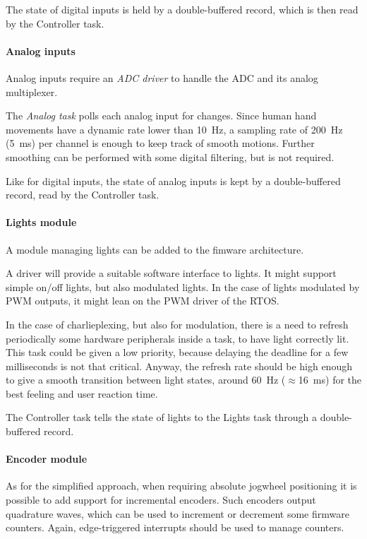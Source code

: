 \documentclass[a4paper,10pt]{article}
\begin{document}
\begin{multicols}{2}
The state of digital inputs is held by a double-buffered record, which is then
read by the Controller task.


\paragraph{Analog inputs}
Analog inputs require an \emph{ADC driver} to handle the ADC and its analog
multiplexer.

The \emph{Analog task} polls each analog input for changes. Since human hand
movements have a dynamic rate lower than 10~Hz, a sampling rate of 200~Hz
(5~ms) per channel is enough to keep track of smooth motions. Further
smoothing can be performed with some digital filtering, but is not required.

Like for digital inputs, the state of analog inputs is kept by a
double-buffered record, read by the Controller task.


\paragraph{Lights module}
A module managing lights can be added to the fimware architecture.

A driver will provide a suitable software interface to lights. It might
support simple on/off lights, but also modulated lights. In the case of lights
modulated by PWM outputs, it might lean on the PWM driver of the RTOS.

In the case of charlieplexing, but also for modulation, there is a need to
refresh periodically some hardware peripherals inside a task, to have light
correctly lit. This task could be given a low priority, because delaying the
deadline for a few milliseconds is not that critical. Anyway, the refresh rate
should be high enough to give a smooth transition between light states, around
60~Hz ($\approx$16~ms) for the best feeling and user reaction time.

The Controller task tells the state of lights to the Lights task through a
double-buffered record.


\paragraph{Encoder module}
As for the simplified approach, when requiring absolute jogwheel positioning
it is possible to add support for incremental encoders. Such encoders output
quadrature waves, which can be used to increment or decrement some firmware
counters. Again, edge-triggered interrupts should be used to manage counters.


\end{multicols}
\end{document}
